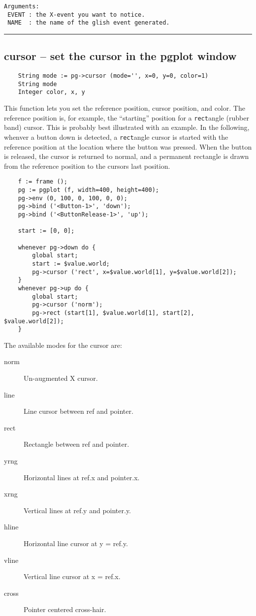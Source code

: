 \begin{verbatim}
Arguments:
 EVENT : the X-event you want to notice.
 NAME  : the name of the glish event generated.
\end{verbatim}

\hrule

\subsection*{cursor -- set the cursor in the pgplot window}

\begin{verbatim}
    String mode := pg->cursor (mode='', x=0, y=0, color=1)
    String mode
    Integer color, x, y
\end{verbatim}

This function lets you set the reference position, cursor position,
and color.  The reference position is, for example, the ``starting''
position for a {\tt rect}angle (rubber band) cursor.  This is probably
best illustrated with an example.  In the following, whenver a button
down is detected, a {\tt rect}angle cursor is started with the
reference position at the location where the button was pressed.  When
the button is released, the cursor is returned to normal, and a
permanent rectangle is drawn from the reference position to the
cursors last position.

\begin{verbatim}
    f := frame ();
    pg := pgplot (f, width=400, height=400);
    pg->env (0, 100, 0, 100, 0, 0);
    pg->bind ('<Button-1>', 'down');
    pg->bind ('<ButtonRelease-1>', 'up');

    start := [0, 0];

    whenever pg->down do {
        global start;
        start := $value.world;
        pg->cursor ('rect', x=$value.world[1], y=$value.world[2]);
    }
    whenever pg->up do {
        global start;
        pg->cursor ('norm');
        pg->rect (start[1], $value.world[1], start[2], $value.world[2]);
    }
\end{verbatim}

The available modes for the cursor are:

\begin{description}
\item[norm]  Un-augmented X cursor.
\item[line]  Line cursor between ref and pointer.
\item[rect]  Rectangle between ref and pointer.
\item[yrng]  Horizontal lines at ref.x and pointer.x.
\item[xrng]  Vertical lines at ref.y and pointer.y.
\item[hline] Horizontal line cursor at y = ref.y.
\item[vline] Vertical line cursor at x = ref.x.
\item[cross] Pointer centered cross-hair.
\end{description}

